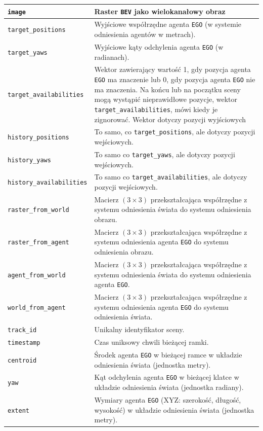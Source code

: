 \begin{center}
\begin{tabular}{ | m{4cm} | m{12cm}| } 
\hline
\texttt{image} & Raster \texttt{BEV} jako wielokanałowy obraz\\
\hline
\texttt{target\_positions} & Wyjściowe współrzędne agenta \texttt{EGO} (w systemie odniesienia agentów w metrach).\\
\hline
\texttt{target\_yaws} & Wyjściowe kąty odchylenia agenta \texttt{EGO} (w radianach).\\
\hline
\texttt{target\_availabilities} & Wektor zawierający wartość 1, gdy pozycja agenta \texttt{EGO} ma znaczenie lub 0, gdy pozycja agenta \texttt{EGO} nie ma znaczenia. Na końcu lub na początku sceny mogą wystąpić nieprawidłowe pozycje, wektor \texttt{target\_availabilities}, mówi kiedy je zignorować. Wektor dotyczy pozycji wyjściowych\\
\hline
\texttt{history\_positions} & To samo, co \texttt{target\_positions}, ale dotyczy pozycji wejściowych.\\
\hline
\texttt{history\_yaws} & To samo co \texttt{target\_yaws}, ale dotyczy pozycji wejściowych.\\
\hline
\texttt{history\_availabilities} & To samo co \texttt{target\_availabilities}, ale dotyczy pozycji wejściowych.\\
\hline
\texttt{raster\_from\_world} & Macierz $(3\times3)$ przekształcająca współrzędne z systemu odniesienia świata do systemu odniesienia obrazu.\\
\hline
\texttt{raster\_from\_agent} & Macierz $(3\times3)$ przekształcająca współrzędne z systemu odniesienia agenta \texttt{EGO} do systemu odniesienia obrazu.\\
\hline
\texttt{agent\_from\_world} & Macierz $(3\times3)$ przekształcająca współrzędne z systemu odniesienia świata do systemu odniesienia agenta \texttt{EGO}.\\
\hline
\texttt{world\_from\_agent} & Macierz $(3\times3)$ przekształcająca współrzędne z systemu odniesienia agenta \texttt{EGO} do systemu odniesienia świata.\\
\hline
\texttt{track\_id} & Unikalny identyfikator sceny.\\
\hline
\texttt{timestamp} & Czas uniksowy chwili bieżącej ramki.\\
\hline
\texttt{centroid} & Środek agenta \texttt{EGO} w bieżącej ramce w układzie odniesienia świata (jednostka metry).\\
\hline
\texttt{yaw} & Kąt odchylenia agenta \texttt{EGO} w bieżącej klatce w układzie odniesienia świata (jednostka radiany).\\
\hline
\texttt{extent} & Wymiary agenta \texttt{EGO} (XYZ: szerokość, długość, wysokość) w układzie odniesienia świata (jednostka metry).\\
\hline
\end{tabular}
\end{center}


